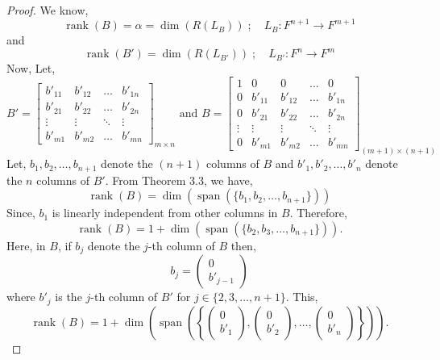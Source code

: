 \documentclass[12pt, a4paper]{article}
\theoremstyle{definition}
\theoremstyle{remark}
\DeclareMathOperator{\Span}{span}
\DeclareMathOperator{\rank}{rank}
\begin{document}
\begin{proof}
We know,
\[
\rank(B) = \alpha = \dim(R(L_B)) \;; \quad L_B : F^{n+1} \to F^{m+1}
\]
and
\[
\rank(B') = \dim(R(L_{B'})) \;; \quad L_{B'} : F^n \to F^m
\]
Now, Let,
\[
B' = \begin{bmatrix}
b'_{11} & b'_{12} & \dots & b'_{1n} \\
b'_{21} & b'_{22} & \dots & b'_{2n} \\
\vdots & \vdots & \ddots & \vdots \\
b'_{m1} & b'_{m2} & \dots & b'_{mn}
\end{bmatrix}_{m \times n}
\text{ and }
B = \begin{bmatrix}
1 & 0 & 0 & \dots & 0 \\
0 & b'_{11} & b'_{12} & \dots & b'_{1n} \\
0 & b'_{21} & b'_{22} & \dots & b'_{2n} \\
\vdots & \vdots & \vdots & \ddots & \vdots \\
0 & b'_{m1} & b'_{m2} & \dots & b'_{mn}
\end{bmatrix}_{(m+1) \times (n+1)}
\]
Let, $b_1, b_2, \dots, b_{n+1}$ denote the $(n+1)$ columns of $B$ and $b'_1, b'_2, \dots, b'_n$ denote the $n$ columns of $B'$. From Theorem 3.3, we have,
\[
\rank(B) = \dim(\Span(\{b_1, b_2, \dots, b_{n+1}\}))
\]
Since, $b_1$ is linearly independent from other columns in $B$. Therefore,
\[
\rank(B) = 1 + \dim(\Span(\{b_2, b_3, \dots, b_{n+1}\})).
\]
Here, in $B$, if $b_j$ denote the $j$-th column of $B$ then,
\[
b_j = \begin{pmatrix} 0 \\ b'_{j-1} \end{pmatrix}
\]
where $b'_j$ is the $j$-th column of $B'$ for $j \in \{2, 3, \dots, n+1\}$. This,
\begin{equation}
\rank(B) = 1 + \dim\left(\Span\left(\left\{ \begin{pmatrix} 0 \\ b'_1 \end{pmatrix}, \begin{pmatrix} 0 \\ b'_2 \end{pmatrix}, \dots, \begin{pmatrix} 0 \\ b'_n \end{pmatrix} \right\}\right)\right). \tag{1}
\end{equation}


\end{proof}
\end{document}
